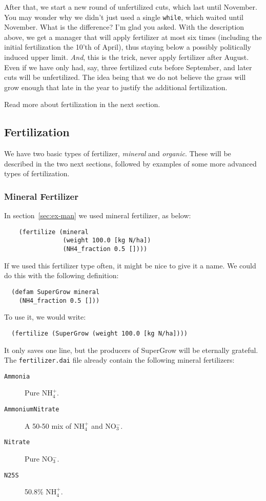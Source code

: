 \documentclass[a4paper]{article}
\begin{document}
After that, we start a new round of unfertilized cuts, which last
until November.  You may wonder why we didn't just used a single
\texttt{while}, which waited until November.  What is the difference?
I'm glad you asked.  With the description above, we get a manager that
will apply fertilizer at most six times (including the initial
fertilization the 10'th of April), thus staying below a possibly
politically induced upper limit.  \emph{And}, this is the trick, never
apply fertilizer after August.  Even if we have only had, say, three
fertilized cuts before September, and later cuts will be unfertilized.
The idea being that we do not believe the grass will grow enough that
late in the year to justify the additional fertilization.

Read more about fertilization in the next section.

\subsection{Fertilization}
\label{sec:fertilizer}

We have two basic types of fertilizer, \emph{mineral} and
\emph{organic}.  These will be described in the two next sections,
followed by examples of some more advanced types of fertilization. 

\subsubsection{Mineral Fertilizer}

In section~\ref{sec:ex-man} we used mineral fertilizer, as below:
\begin{verbatim}
    (fertilize (mineral
                (weight 100.0 [kg N/ha])
                (NH4_fraction 0.5 [])))
\end{verbatim}
If we used this fertilizer type often, it might be nice to give it a
name.  We could do this with the following definition:
\begin{verbatim}
  (defam SuperGrow mineral
    (NH4_fraction 0.5 []))
\end{verbatim}
To use it, we would write:
\begin{verbatim}
  (fertilize (SuperGrow (weight 100.0 [kg N/ha])))
\end{verbatim}
It only saves one line, but the producers of SuperGrow\texttrademark{}
will be eternally grateful.  The \texttt{fertilizer.dai} file already
contain the following mineral fertilizers:
\begin{description}
\item[\texttt{Ammonia}] Pure NH$_4^+$.
\item[\texttt{AmmoniumNitrate}] A 50-50 mix of NH$_4^+$ and NO$_3^-$.
\item[\texttt{Nitrate}] Pure NO$_3^-$.
\item[\texttt{N25S}] 50.8\% NH$_4^+$.
\end{description}
\end{document}

